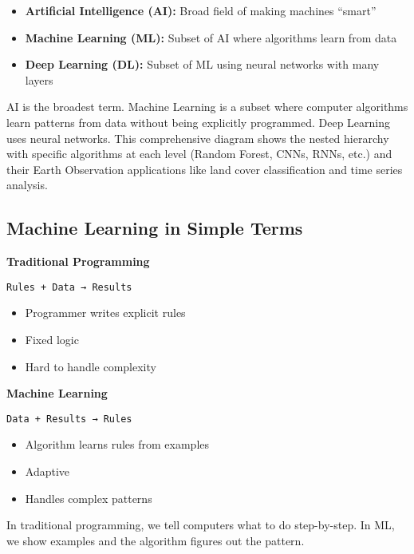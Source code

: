\documentclass[
  letterpaper,
  DIV=11,
  numbers=noendperiod]{scrartcl}
\providecommand{\tightlist}{%
  \setlength{\itemsep}{0pt}\setlength{\parskip}{0pt}}
\begin{document}
\begin{itemize}
\tightlist
\item
  \textbf{Artificial Intelligence (AI):} Broad field of making machines
  ``smart''
\item
  \textbf{Machine Learning (ML):} Subset of AI where algorithms learn
  from data
\item
  \textbf{Deep Learning (DL):} Subset of ML using neural networks with
  many layers
\end{itemize}

AI is the broadest term. Machine Learning is a subset where computer
algorithms learn patterns from data without being explicitly programmed.
Deep Learning uses neural networks. This comprehensive diagram shows the
nested hierarchy with specific algorithms at each level (Random Forest,
CNNs, RNNs, etc.) and their Earth Observation applications like land
cover classification and time series analysis.

\subsection{Machine Learning in Simple
Terms}\label{machine-learning-in-simple-terms}

\textbf{Traditional Programming}

\begin{verbatim}
Rules + Data → Results
\end{verbatim}

\begin{itemize}
\tightlist
\item
  Programmer writes explicit rules
\item
  Fixed logic
\item
  Hard to handle complexity
\end{itemize}

\textbf{Machine Learning}

\begin{verbatim}
Data + Results → Rules
\end{verbatim}

\begin{itemize}
\tightlist
\item
  Algorithm learns rules from examples
\item
  Adaptive
\item
  Handles complex patterns
\end{itemize}

In traditional programming, we tell computers what to do step-by-step.
In ML, we show examples and the algorithm figures out the pattern.
\end{document}
